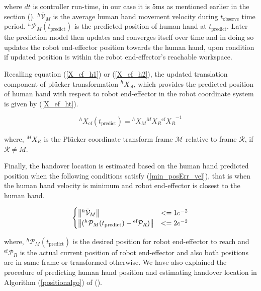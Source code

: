 where $dt$ is controller run-time, in our case it is 5ms as mentioned earlier in the section (). ${}^{h}\mathcal{\bar{V}}_{M}$ is the average human hand movement velocity during $t_\text{observe}$ time period. ${}^{h}\mathcal{P}_M(t_\text{predict})$ is the predicted position of human hand at $t_\text{predict}$. Later the prediction model then updates and converges itself over time and in doing so updates the robot end-effector position towards the human hand, upon condition if updated position is within the robot end-effector's reachable workspace. 

Recalling equation (\ref{X_ef_h1}) or (\ref{X_ef_h2}), the updated translation component of pl\"ucker transformation ${}^{h}{X}_{\text{ef}}$, which provides the predicted position of human hand with respect to robot end-effector in the robot coordinate system is given by (\ref{X_ef_ht}).

\begin{equation}\label{X_ef_ht}
{}^{h}{X}_{\text{ef}}(t_\text{predict}) =  {}^{h}{X}_M  {}^{M}{X}_R {{}^{\text{ef}}{X}_R}^{-1}
\end{equation}

where, ${}^{M}{X}_R$ is the Pl\"ucker coordinate transform frame $\mathcal{M}$ relative to frame $\mathcal{R}$, if $\mathcal R \neq M$.


Finally, the handover location is estimated based on the human hand predicted position when the following conditions satisfy (\ref{min_posErr_vel}), that is when the human hand velocity is minimum and robot end-effector is closest to the human hand.

\begin{equation}\label{min_posErr_vel}
\begin{cases}
	\norm{{}^{h}\mathcal{\bar{V}}_{M}}& <= 1e^{-2} \\
	\norm{({}^{h}\mathcal{P}_{M}(t_\text{predict}) - {}^{\text{ef}}\mathcal{P}_{R})} & <= 2e^{-2}
\end{cases}
\end{equation}

where, ${}^{h}\mathcal{P}_{M}(t_\text{predict})$ is the desired position for robot end-effector to reach and ${}^{\text{ef}}\mathcal{P}_{R}$ is the actual current position of robot end-effector and also both positions are in same frame or transformed otherwise. We have  also explained the procedure of predicting human hand position and estimating handover location in Algorithm (\ref{positionalgo}) of ().

